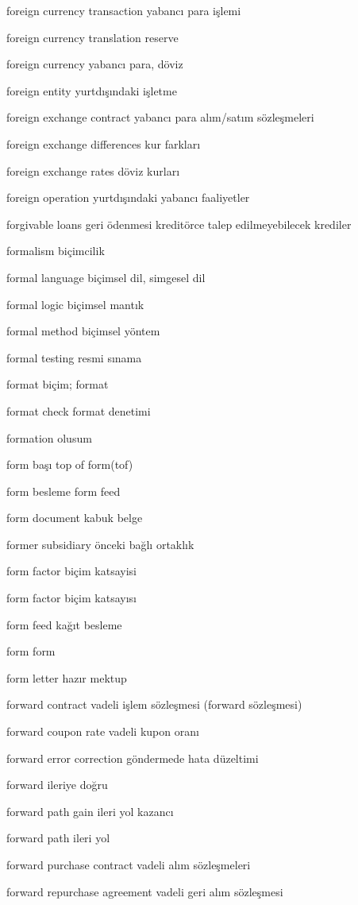 \documentclass[12pt,fleqn]{article}\usepackage{../../common}
\begin{document}
foreign currency transaction yabancı para işlemi

foreign currency translation reserve

foreign currency yabancı para, döviz

foreign entity yurtdışındaki işletme

foreign exchange contract yabancı para alım/satım sözleşmeleri

foreign exchange differences kur farkları

foreign exchange rates döviz kurları

foreign operation yurtdışındaki yabancı faaliyetler

forgivable loans geri ödenmesi kreditörce talep edilmeyebilecek krediler

formalism biçimcilik

formal language biçimsel dil, simgesel dil

formal logic biçimsel mantık

formal method biçimsel yöntem

formal testing resmi sınama

format biçim; format

format check format denetimi

formation olusum

form başı top of form(tof)

form besleme form feed

form document kabuk belge

former subsidiary önceki bağlı ortaklık

form factor biçim katsayisi

form factor biçim katsayısı

form feed kağıt besleme

form form

form letter hazır mektup

forward contract vadeli işlem sözleşmesi (forward sözleşmesi)

forward coupon rate vadeli kupon oranı

forward error correction göndermede hata düzeltimi

forward ileriye doğru

forward path gain ileri yol kazancı

forward path ileri yol

forward purchase contract vadeli alım sözleşmeleri

forward repurchase agreement vadeli geri alım sözleşmesi
\end{document}

